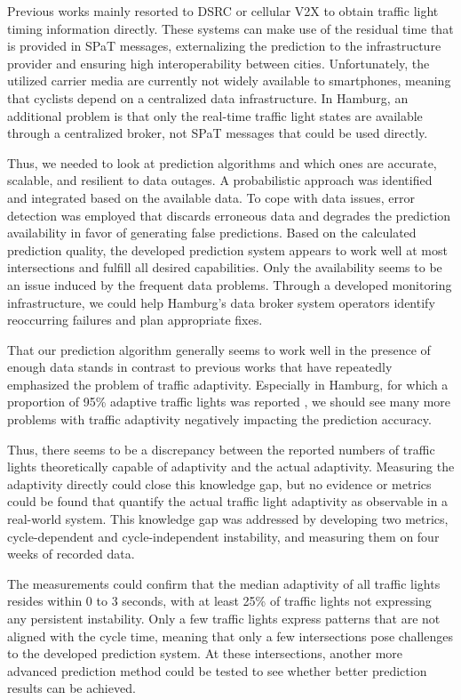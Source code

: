 Previous works mainly resorted to DSRC or cellular V2X to obtain traffic light timing information directly. These systems can make use of the residual time that is provided in SPaT messages, externalizing the prediction to the infrastructure provider and ensuring high interoperability between cities. Unfortunately, the utilized carrier media are currently not widely available to smartphones, meaning that cyclists depend on a centralized data infrastructure. In Hamburg, an additional problem is that only the real-time traffic light states are available through a centralized broker, not SPaT messages that could be used directly. 

Thus, we needed to look at prediction algorithms and which ones are accurate, scalable, and resilient to data outages. A probabilistic approach was identified and integrated based on the available data. To cope with data issues, error detection was employed that discards erroneous data and degrades the prediction availability in favor of generating false predictions. Based on the calculated prediction quality, the developed prediction system appears to work well at most intersections and fulfill all desired capabilities. Only the availability seems to be an issue induced by the frequent data problems. Through a developed monitoring infrastructure, we could help Hamburg's data broker system operators identify reoccurring failures and plan appropriate fixes. 

That our prediction algorithm generally seems to work well in the presence of enough data stands in contrast to previous works that have repeatedly emphasized the problem of traffic adaptivity. Especially in Hamburg, for which a proportion of 95\% adaptive traffic lights was reported \cite{bodenheimer_enabling_2014}, we should see many more problems with traffic adaptivity negatively impacting the prediction accuracy. 

Thus, there seems to be a discrepancy between the reported numbers of traffic lights theoretically capable of adaptivity and the actual adaptivity. Measuring the adaptivity directly could close this knowledge gap, but no evidence or metrics could be found that quantify the actual traffic light adaptivity as observable in a real-world system. This knowledge gap was addressed by developing two metrics, cycle-dependent and cycle-independent instability, and measuring them on four weeks of recorded data.

The measurements could confirm that the median adaptivity of all traffic lights resides within 0 to 3 seconds, with at least 25\% of traffic lights not expressing any persistent instability. Only a few traffic lights express patterns that are not aligned with the cycle time, meaning that only a few intersections pose challenges to the developed prediction system. At these intersections, another more advanced prediction method could be tested to see whether better prediction results can be achieved.

